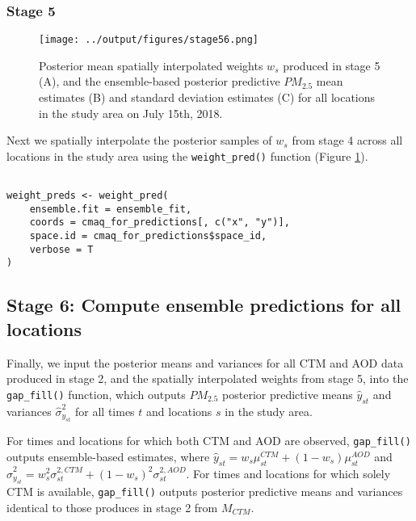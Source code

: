 \documentclass[12pt]{article}
\begin{document}
\subsubsection*{Stage 5}


\begin{figure}[ht]
    \centering
    \texttt{[image: ../output/figures/stage56.png]}
    \caption{Posterior mean spatially interpolated weights $w_s$ produced in stage 5 (A), and the ensemble-based posterior predictive $PM_{2.5}$ mean estimates (B) and standard deviation estimates (C) for all locations in the study area on July 15th, 2018.}
    \label{fig:stage56}
\end{figure}

Next we spatially interpolate the posterior samples of $w_s$ from stage 4 across all locations in the study area using the \texttt{weight\_pred()} function (Figure \ref{fig:stage56}).

\begin{lstlisting}

weight_preds <- weight_pred(
    ensemble.fit = ensemble_fit,
    coords = cmaq_for_predictions[, c("x", "y")],
    space.id = cmaq_for_predictions$space_id,
    verbose = T
)

\end{lstlisting}



\subsection*{Stage 6: Compute ensemble predictions for all locations}

Finally, we input the posterior means and variances for all CTM and AOD data produced in stage 2, and the spatially interpolated weights from stage 5, into the \texttt{gap\_fill()} function, which outputs $PM_{2.5}$ posterior predictive means $\hat{y}_{st}$ and variances $\hat{\sigma}^{2}_{y_{st}}$ for all times $t$ and locations $s$ in the study area. 

For times and locations for which both CTM and AOD are observed, \texttt{gap\_fill()} outputs ensemble-based estimates, where $\hat{y}_{st} = w_s \mu^{CTM}_{st} + (1 - w_s)\mu^{AOD}_{st}$ and $\hat{\sigma}^2_{y_{st}} = w^2_s \sigma^{2, CTM}_{st} + (1 - w_s)^2 \sigma^{2, AOD}_{st}$. 
For times and locations for which solely CTM is available, \texttt{gap\_fill()} outputs posterior predictive means and variances identical to those produces in stage 2 from $M_{CTM}$. 
\end{document}
